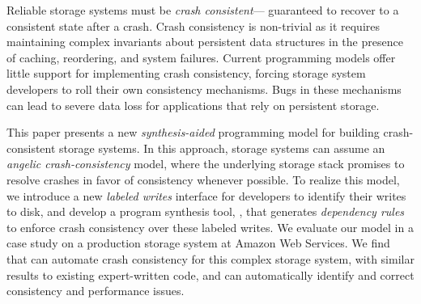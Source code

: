 Reliable storage systems must be \emph{crash consistent}---%
guaranteed to recover to a consistent state after a crash. %
Crash consistency is non-trivial
as it requires maintaining complex invariants
about persistent data structures 
in the presence of caching, reordering, and system failures.
Current programming models offer little support for implementing crash consistency,
forcing storage system developers to roll their own consistency mechanisms.
Bugs in these mechanisms can lead to severe data loss
for applications that rely on persistent storage.\tighten

This paper presents a new \emph{synthesis-aided} programming model
for building crash-consistent storage systems.
In this approach, storage systems can assume
an \emph{angelic crash-consistency} model,
where the underlying storage stack
promises to resolve crashes in favor of consistency whenever possible.
To realize this model,
we introduce a new \emph{labeled writes} interface for developers to identify their writes to disk,
and develop a program synthesis tool, \depsynth,
that generates \emph{dependency rules}
to enforce crash consistency over these labeled writes.
We evaluate our model in a case study
on a production storage system at Amazon Web Services.
We find that \depsynth can automate crash consistency for this complex storage system,
with similar results to existing expert-written code,
and can automatically identify and correct consistency and performance issues.
